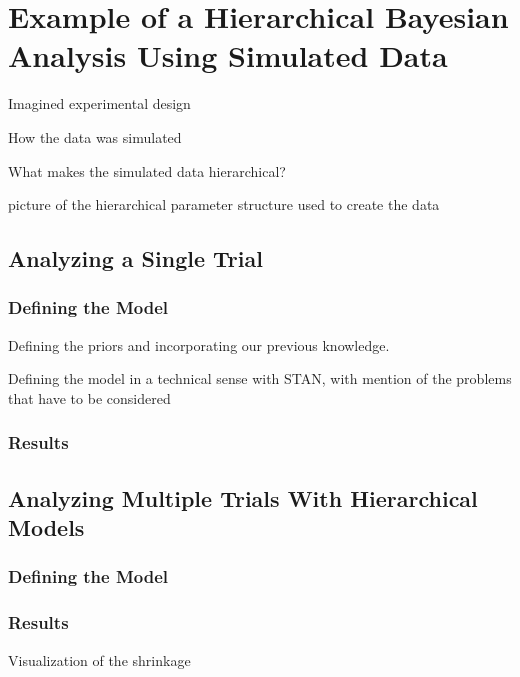 \documentclass[12pt,a4paper,leqno]{report}
\theoremstyle{plain}
\theoremstyle{definition}
\theoremstyle{remark}
\begin{document}
\chapter{Example of a Hierarchical Bayesian Analysis Using Simulated Data}\label{example}

Imagined experimental design

How the data was simulated

What makes the simulated data hierarchical?

picture of the hierarchical parameter structure used to create the data

\section{Analyzing a Single Trial}\label{1trial}

\subsection{Defining the Model}\label{1model}

Defining the priors and incorporating our previous knowledge.

Defining the model in a technical sense with STAN, with mention of the problems that
have to be considered

\subsection{Results}\label{1results}

\section{Analyzing Multiple Trials With Hierarchical Models}\label{pooling}

\subsection{Defining the Model}\label{hiermodel}

\subsection{Results}\label{hierresults}

Visualization of the shrinkage

\end{document}
